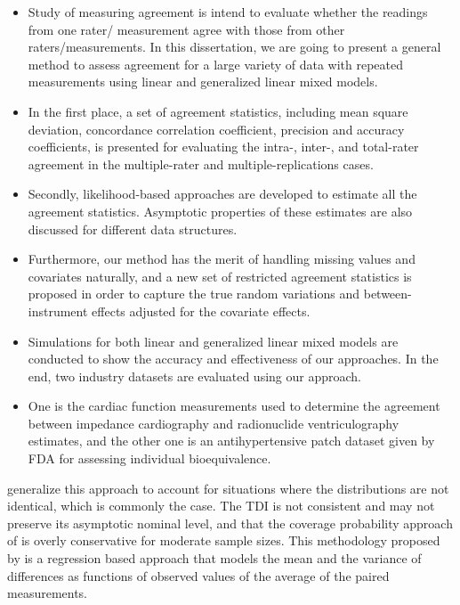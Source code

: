 \documentclass[Main.tex]{subfiles}
\begin{document}
	\begin{itemize}
		\item Study of measuring agreement is intend to evaluate whether the readings from one rater/ measurement 
		agree with those from other raters/measurements. 
		In this dissertation, we are going to present a general method to assess agreement for a large 
		variety of data with repeated measurements using linear and generalized linear mixed models. 
		\item In the first place, a set of agreement statistics, including mean square deviation, concordance 
		correlation coefficient, precision and accuracy coefficients, is presented for evaluating the 
		intra-, inter-, and total-rater agreement in the multiple-rater and multiple-replications cases. 
		\item Secondly, likelihood-based approaches are developed to estimate all the agreement statistics. 
		Asymptotic properties of these estimates are also discussed for different data structures. 
		\item Furthermore, our method has the merit of handling missing values and covariates naturally, 
		and a new set of restricted agreement statistics is proposed in order to capture the true random 
		variations and between-instrument effects adjusted for the covariate effects. 
		
		\item Simulations for both linear and generalized linear mixed models are conducted to show the accuracy and effectiveness 
		of our approaches. In the end, two industry datasets are evaluated using our approach. 
		\item One is the cardiac function measurements used to determine the agreement between impedance cardiography and radionuclide 
		ventriculography estimates, and the other one is an antihypertensive patch dataset given by FDA for assessing 
		individual bioequivalence.
	\end{itemize}
	
	\newpage
	
	
	
	
	
	
	\citet{pkcng} generalize this approach to account for situations
	where the distributions are not identical, which is commonly the
	case. The TDI is not consistent and may not preserve its
	asymptotic nominal level, and that the coverage probability
	approach of \citet{lin2002} is overly conservative for moderate
	sample sizes. This methodology proposed by \citet{pkcng} is a
	regression based approach that models the mean and the variance of
	differences as functions of observed values of the average of the
	paired measurements.
	
\end{document}
